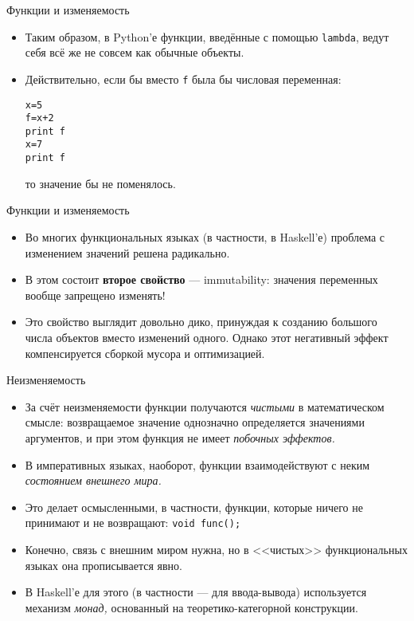\documentclass[xcolor=dvipsnames]{beamer}
\begin{document}
\begin{frame}[fragile]{Функции и изменяемость}
 
 \begin{itemize}[<+->]
  \item Таким образом, в Python'е функции, введённые с помощью \texttt{lambda}, ведут себя всё же не совсем как обычные объекты.
  \item Действительно, если бы вместо \texttt{f} была бы числовая переменная:
\begin{verbatim}
x=5
f=x+2
print f
x=7
print f
\end{verbatim}
то значение бы не поменялось.
 \end{itemize}

\end{frame}

\begin{frame}{Функции и изменяемость}

\begin{itemize}[<+->]
 \item Во многих функциональных языках (в частности, в Haskell'е) проблема с изменением значений решена радикально.
 \item В этом состоит {\bf второе свойство} --- immutability: значения переменных вообще запрещено изменять!
 \item Это свойство выглядит довольно дико, принуждая к созданию большого числа объектов вместо изменений одного. Однако этот негативный эффект компенсируется сборкой мусора и оптимизацией.
 \end{itemize}
\end{frame}

\begin{frame}{Неизменяемость}
\begin{itemize}[<+->]
 \item За счёт неизменяемости функции получаются {\em чистыми} в математическом смысле: возвращаемое значение однозначно определяется значениями аргументов, и при этом функция не имеет {\em побочных эффектов.}
 \item В императивных языках, наоборот, функции взаимодействуют с неким {\em состоянием внешнего мира.}
 \item Это делает осмысленными, в частности, функции, которые ничего не принимают и не возвращают:
 \texttt{void func();}
 \item Конечно, связь с внешним миром нужна, но в <<чистых>> функциональных языках она прописывается явно.
 \item В Haskell'е для этого (в частности --- для ввода-вывода) используется механизм {\em монад,} основанный на теоретико-категорной конструкции.
\end{itemize}
\end{frame}
\end{document}
